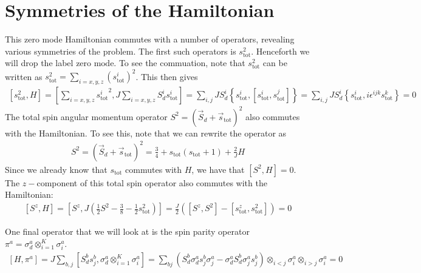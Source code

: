 \documentclass{revtex4-2}
\begin{document}
\section{Symmetries of the Hamiltonian}
This zero mode Hamiltonian commutes with a number of operators, revealing various symmetries of the problem. The first such operators is \(s_\text{tot}^2\). Henceforth we will drop the label \(\text{zero mode}\). To see the commuation, note that \(s_\text{tot}^2\) can be written as \(s_\text{tot}^2 = \sum_{i=x,y,z}\left(s_\text{tot}^i\right)^2\). This then gives
\begin{align}
\left[s_\text{tot}^2, H\right] = \left[\sum_{i=x,y,z}{s^i_\text{tot}}^2, J \sum_{i=x,y,z} S_d^i s^i_\text{tot}\right] = \sum_{i,j}J S_d^i \left\{s_\text{tot}^i, \left[s_\text{tot}^i,s_\text{tot}^j\right]\right\} = \sum_{i,j}J S_d^i \left\{s_\text{tot}^i, i \epsilon^{ijk}s^k_\text{tot}\right\} = 0
\end{align}
The total spin angular  momentum operator \(S^2 = \left(\vec S_d + \vec s_\text{tot}\right)^2 \) also commutes with the Hamiltonian. To see this, note that we can rewrite the operator as
\begin{align}
	S^2 = \left(\vec S_d + \vec s_\text{tot}\right)^2 = \frac{3}{4} + s_\text{tot}\left(s_\text{tot} + 1\right) + \frac{2}{J} H
\end{align}
Since we already know that \(s_\text{tot}\) commutes with \(H\), we have that \(\left[S^2, H\right] = 0\). The \(z-\)component of this total spin operator also commutes with the Hamiltonian:
\begin{align}
	\left[S^z, H\right] = \left[S^z, J \left(\frac{1}{2}S^2 - \frac{3}{8} - \frac{1}{2}s_\text{tot}^2\right) \right]  = \frac{J}{2}\left(\left[S^z, S^2\right] - \left[s_\text{tot}^z, s_\text{tot}^2\right] \right) = 0
\end{align}

One final operator that we will look at is the spin parity operator \(\pi^a = \sigma_d^a \otimes_{i=1}^K \sigma_i^a\).
\begin{align}
	\left[H, \pi^a\right] = J\sum_{b,j} \left[S_d^b s_j^b, \sigma_d^a \otimes_{i=1}^K \sigma_i^a\right] = \sum_{bj}\left(S_d^b \sigma_d^a s^b_j \sigma^a_j - \sigma_d^a S_d^b \sigma^a_j s^b_j\right) \otimes_{i<j}\sigma_i^a \otimes_{i>j}\sigma^a_i = 0
\end{align}
\end{document}
